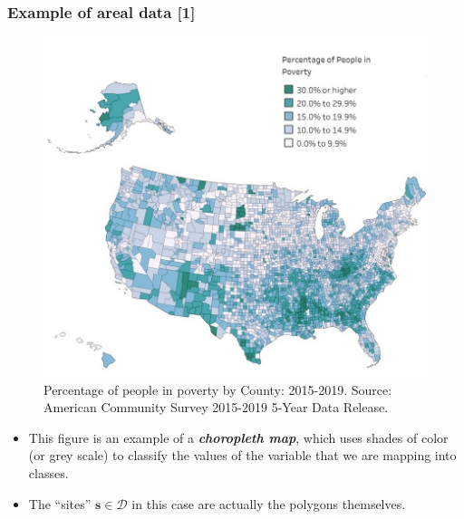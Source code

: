 \documentclass[12pt]{beamer}
\begin{document}
\begin{frame}
\frametitle{Example of areal data [1]}
\begin{figure}
\includegraphics[scale=0.35]{Figures/Poverty_US.jpg}
\caption{\footnotesize Percentage of people in poverty by County: 2015-2019. Source: American Community Survey 2015-2019 5-Year Data Release.}
\end{figure}
\vspace{-9pt}
\footnotesize{
\begin{itemize}
\item This figure is an example of a \emph{\textbf{choropleth map}}, which uses shades of color (or grey scale) to classify the values of the variable that we are mapping into classes.
\item The ``sites'' $\boldsymbol{s} \in \mathcal{D}$ in this case are actually the polygons themselves. %
\end{itemize}
}
\end{frame}
\end{document}
